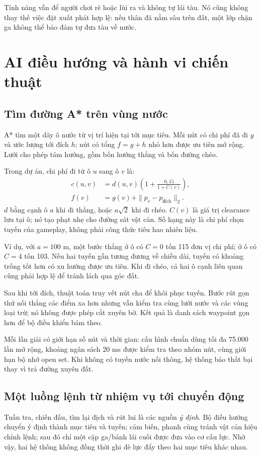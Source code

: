 \documentclass[11pt,a4paper,oneside]{report}
\begin{document}
Tính năng vẫn để người chơi rẽ hoặc lùi ra và không tự lái tàu. Nó cũng không thay thế việc đặt xuất phát hợp lệ: nếu thân đã nằm sâu trên đất, một lớp chặn ga không thể bảo đảm tự đưa tàu về nước.

\begingroup{}\setlength{\parskip}{3pt}
\chapter{AI điều hướng và hành vi chiến thuật}
\section{Tìm đường A* trên vùng nước}
A* tìm một dãy ô nước từ vị trí hiện tại tới mục tiêu. Mỗi nút có chi phí đã đi $g$ và ước lượng tới đích $h$; nút có tổng $f=g+h$ nhỏ hơn được ưu tiên mở rộng. Lưới cho phép tám hướng, gồm bốn hướng thẳng và bốn đường chéo.

Trong dự án, chi phí đi từ ô $u$ sang ô $v$ là:
\begin{align}
 c(u,v)&=d(u,v)\left(1+\frac{0{,}15}{1+C(v)}\right),\\
 f(v)&=g(v)+\|p_v-p_{\text{đích}}\|_2.
\end{align}
$d$ bằng cạnh ô $a$ khi đi thẳng, hoặc $a\sqrt2$ khi đi chéo. $C(v)$ là giá trị clearance lưu tại ô; nó tạo phạt nhẹ cho đường sát vật cản. Số hạng này là chi phí chọn tuyến của gameplay, không phải công thức tiêu hao nhiên liệu.

Ví dụ, với $a=100$ m, một bước thẳng ở ô có $C=0$ tốn 115 đơn vị chi phí; ở ô có $C=4$ tốn 103. Nếu hai tuyến gần tương đương về chiều dài, tuyến có khoảng trống tốt hơn có xu hướng được ưu tiên. Khi đi chéo, cả hai ô cạnh liên quan cũng phải hợp lệ để tránh lách qua góc đất.

Sau khi tới đích, thuật toán truy vết nút cha để khôi phục tuyến. Bước rút gọn thử nối thẳng các điểm xa hơn nhưng vẫn kiểm tra cùng lưới nước và các vùng loại trừ; nó không được phép cắt xuyên bờ. Kết quả là danh sách waypoint gọn hơn để bộ điều khiển bám theo.

Mỗi lần giải có giới hạn số nút và thời gian: cấu hình chuẩn dùng tối đa 75.000 lần mở rộng, khoảng ngân sách 20 ms được kiểm tra theo nhóm nút, cùng giới hạn bộ nhớ open set. Khi không có tuyến nước nối thông, hệ thống báo thất bại thay vì trả đường xuyên đất.

\section{Một luồng lệnh từ nhiệm vụ tới chuyển động}
Tuần tra, chiến đấu, tìm lại địch và rút lui là các nguồn \textit{ý định}. Bộ điều hướng chuyển ý định thành mục tiêu và tuyến; cảm biến, phanh cùng tránh vật cản hiệu chỉnh lệnh; sau đó chỉ một cặp ga/bánh lái cuối được đưa vào cơ cấu lực. Nhờ vậy, hai hệ thống không đồng thời ghi đè lực đẩy theo hai mục tiêu khác nhau.
\end{document}
